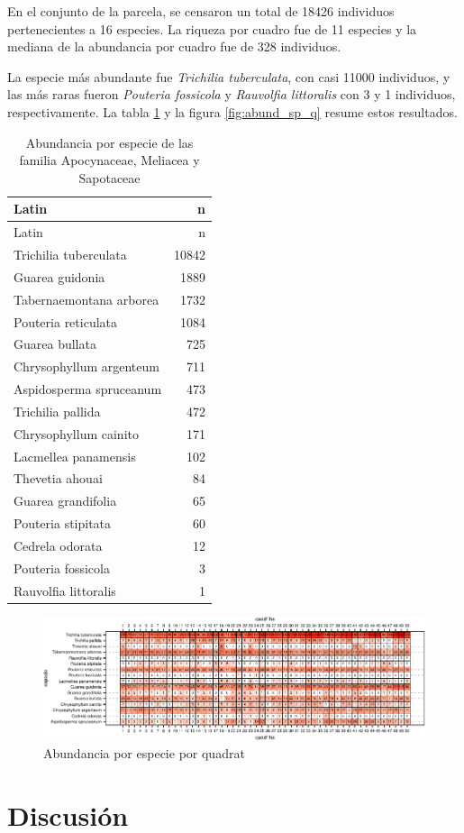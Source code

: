 \documentclass[11pt,]{article}
\begin{document}
En el conjunto de la parcela, se censaron un total de 18426 individuos
pertenecientes a 16 especies. La riqueza por cuadro fue de 11 especies y
la mediana de la abundancia por cuadro fue de 328 individuos.

La especie más abundante fue \emph{Trichilia tuberculata}, con casi
11000 individuos, y las más raras fueron \emph{Pouteria fossicola} y
\emph{Rauvolfia littoralis} con 3 y 1 individuos, respectivamente. La
tabla \ref{tab:abun_sp} y la figura \ref{fig:abund_sp_q} resume estos
resultados.

\begin{longtable}[]{@{}lr@{}}
\caption{\label{tab:abun_sp}Abundancia por especie de las familia
Apocynaceae, Meliacea y Sapotaceae}\tabularnewline
\toprule
Latin & n\tabularnewline
\midrule
\endfirsthead
\toprule
Latin & n\tabularnewline
\midrule
\endhead
Trichilia tuberculata & 10842\tabularnewline
Guarea guidonia & 1889\tabularnewline
Tabernaemontana arborea & 1732\tabularnewline
Pouteria reticulata & 1084\tabularnewline
Guarea bullata & 725\tabularnewline
Chrysophyllum argenteum & 711\tabularnewline
Aspidosperma spruceanum & 473\tabularnewline
Trichilia pallida & 472\tabularnewline
Chrysophyllum cainito & 171\tabularnewline
Lacmellea panamensis & 102\tabularnewline
Thevetia ahouai & 84\tabularnewline
Guarea grandifolia & 65\tabularnewline
Pouteria stipitata & 60\tabularnewline
Cedrela odorata & 12\tabularnewline
Pouteria fossicola & 3\tabularnewline
Rauvolfia littoralis & 1\tabularnewline
\bottomrule
\end{longtable}

\begin{figure}
\centering
\includegraphics{manuscrito_files/figure-latex/unnamed-chunk-3-1.pdf}
\caption{\label{fig:abun_sp_q}Abundancia por especie por quadrat}
\end{figure}

\hypertarget{discusiuxf3n}{%
\section{Discusión}\label{discusiuxf3n}}
\end{document}
